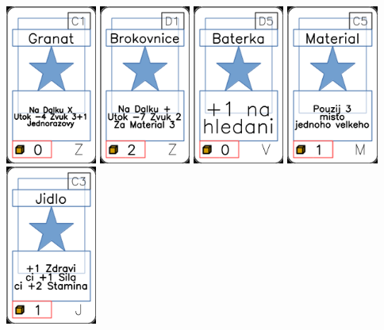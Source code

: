 \documentclass[a4paper]{article}
\begin{document}
	\includegraphics[width=3.0cm]{img-1_100}
	\includegraphics[width=3.0cm]{img-1_105}
	\includegraphics[width=3.0cm]{img-1_79}
	\includegraphics[width=3.0cm]{img-1_44}
	\includegraphics[width=3.0cm]{img-1_12}
\end{document}

